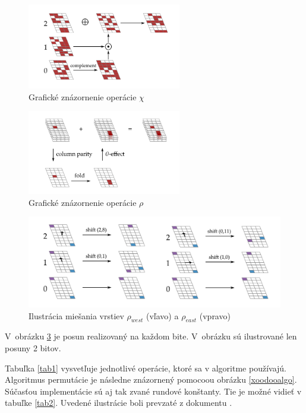 \begin{figure}[h!]
	\centering
	\includegraphics[width=0.6\textwidth]{figures/xoodoochi}
	\caption{Grafické znázornenie operácie $\chi$ \cite{xcb}}
	\label{xoodoochi}
\end{figure}
\begin{figure}[h!]
	\centering
	\includegraphics[width=0.6\textwidth]{figures/xoodooml}
	\caption{Grafické znázornenie operácie $\rho$ \cite{xcb}}
	\label{xoodooml}
\end{figure}
\begin{figure}[h!]
	\centering
	\includegraphics[width=0.9\linewidth]{figures/xoodooshift}
	\caption{Ilustrácia miešania vrstiev $\rho_{west}$ (vľavo) a $\rho_{east}$ (vpravo)\cite{xcb}}
	\label{xoodooshift}
\end{figure}
V~obrázku \ref{xoodooshift} je posun realizovaný na každom bite. V~obrázku sú ilustrované len posuny 2 bitov. 
   
Tabuľka \ref{tab1} vysvetľuje jednotlivé operácie, ktoré sa v algoritme používajú. Algoritmus permutácie je následne znázornený pomocoou obrázku \ref{xoodooalgo}. Súčasťou implementácie sú aj tak zvané rundové konštanty. Tie je možné vidieť v tabuľke \ref{tab2}. Uvedené ilustrácie boli prevzaté z dokumentu \cite{xcb}.

